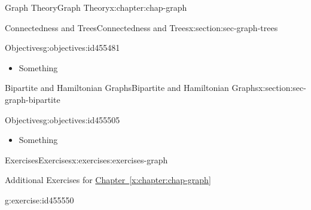 \documentclass[oneside,10pt,]{book}
\newcommand{\xreffont}{\relax}
\numberwithin{equation}{section}
\begin{document}
\begin{chapterptx}{Graph Theory}{}{Graph Theory}{}{}{x:chapter:chap-graph}
%
\begin{sectionptx}{Connectedness and Trees}{}{Connectedness and Trees}{}{}{x:section:sec-graph-trees}
\begin{objectives}{Objectives}{g:objectives:id455481}
%
\begin{itemize}[label=\textbullet]
\item{}Something%
\end{itemize}
\end{objectives}
\end{sectionptx}
%
%
\typeout{************************************************}
\typeout{************************************************}
%
\begin{sectionptx}{Bipartite and Hamiltonian Graphs}{}{Bipartite and Hamiltonian Graphs}{}{}{x:section:sec-graph-bipartite}
\begin{objectives}{Objectives}{g:objectives:id455505}
%
\begin{itemize}[label=\textbullet]
\item{}Something%
\end{itemize}
\end{objectives}
\end{sectionptx}
%
%
\typeout{************************************************}
\typeout{************************************************}
%
\begin{exercises-section}{Exercises}{}{Exercises}{}{}{x:exercises:exercises-graph}
\begin{introduction}{}%
Additional Exercises for \hyperref[x:chapter:chap-graph]{Chapter~{\xreffont\ref{x:chapter:chap-graph}}}%
\end{introduction}%
\begin{divisionexercise}{1}{}{}{g:exercise:id455550}%
%
\end{divisionexercise}%
\end{exercises-section}
\end{chapterptx}
%
%
%
%
\typeout{************************************************}
\typeout{************************************************}
%
%
\appendix
%
\end{document}
